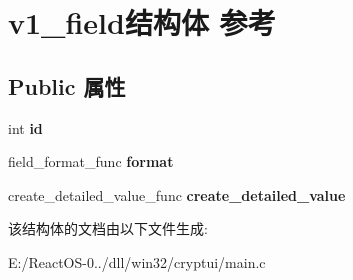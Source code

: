 \hypertarget{structv1__field}{}\section{v1\+\_\+field结构体 参考}
\label{structv1__field}
\subsection*{Public 属性}
\begin{DoxyCompactItemize}
\item 
\mbox{\label{structv1__field_a410477949064fbe3b27fcd1580c25ade}} 
int {\bfseries id}
\item 
\mbox{\label{structv1__field_abc5f92dbe8ca26b12ee1edcd3ad39735}} 
field\+\_\+format\+\_\+func {\bfseries format}
\item 
\mbox{\label{structv1__field_a0a3671d21e8aa09cd997259f4e3f8763}} 
create\+\_\+detailed\+\_\+value\+\_\+func {\bfseries create\+\_\+detailed\+\_\+value}
\end{DoxyCompactItemize}


该结构体的文档由以下文件生成\+:\begin{DoxyCompactItemize}
\item 
E\+:/\+React\+O\+S-\/0../dll/win32/cryptui/main.\+c\end{DoxyCompactItemize}
